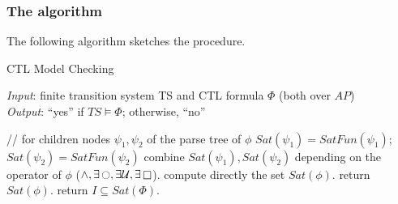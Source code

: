 \documentclass{article}
\begin{document}
\subsubsection{The algorithm}
The following algorithm sketches the procedure. 
\label{subsec-CTLmca}
\begin{algorithm}[H]
    \caption{CTL Model Checking}
    \hspace*{\algorithmicindent} \emph{Input}: finite transition system TS and CTL formula $\Phi$ (both over $AP$) \\
    \hspace*{\algorithmicindent} \emph{Output}: ``yes'' if $TS \vDash \Phi$; otherwise, ``no''
    \begin{algorithmic}[1]
            \State // for children nodes $\psi_1, \psi_2$ of the parse tree of $\phi$
            \State $Sat(\psi_1) = SatFun(\psi_1)$; $Sat(\psi_2) = SatFun(\psi_2)$ 
            \State combine $Sat(\psi_1), Sat(\psi_2)$ depending on the operator of $\phi$ ($\land, \exists\mathop{\ocircle}, \exists\mathbin{\mathcal{U}}, \exists\mathop{\square}$).
        \Else
            \State compute directly the set $Sat(\phi)$.
        \EndIf
        \State return $Sat(\phi)$.
    \EndFunction
    \State return $I \subseteq Sat(\Phi)$.
    \end{algorithmic}
\end{algorithm}
\end{document}
